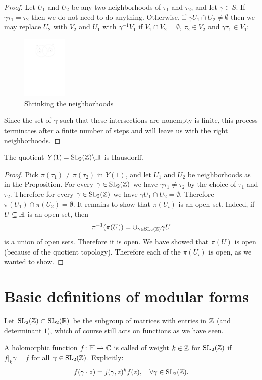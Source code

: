 \begin{proof}
  Let $U_1$ and $U_2$ be any two neighborhoods of $\tau_1$ and $\tau_2$, and let $\gamma\in S$. If $\gamma\tau_1=\tau_2$ then we do not need to do anything. Otherwise, if $\gamma U_1\cap U_2\neq \emptyset$ then we may replace $U_2$ with $V_2$ and $U_1$ with $\gamma^{-1} V_1$ if $V_1\cap V_2=\emptyset$, $\tau_2\in V_2$ and $\gamma\tau_1\in V_1$:
  \begin{figure}[h]
    \centering
    \includegraphics[height=3cm]{Pictures/shrinking-neighborhoods.pdf}
    \caption{Shrinking the neighborhoods}
    \label{fig:shriking-neighborhoods}
  \end{figure}
Since the set of $\gamma$ such that these intersections are nonempty is finite, this process terminates after a finite number of steps and will leave us with the right neighborhoods.
\end{proof}
\begin{corollary}
  The quotient $Y(1) = \operatorname{SL}_2(\mathbb{Z})\backslash\mathbb{H}$ is Hausdorff.
\end{corollary}
\begin{proof}
  Pick $\pi(\tau_1)\neq \pi(\tau_2)$ in $Y(1)$, and let $U_1$ and $U_2$ be neighborhoods as in the Proposition. For every $\gamma\in\operatorname{SL}_2(\mathbb{Z})$ we have $\gamma\tau_1\neq \tau_2$ by the choice of $\tau_1$ and $\tau_2$. Therefore for every $\gamma\in\operatorname{SL}_2(\mathbb{Z})$ we have $\gamma U_1\cap U_2=\emptyset$. Therefore $\pi(U_1)\cap\pi(U_2)=\emptyset$. It remains to show that $\pi(U_i)$ is an open set. Indeed, if $U\subseteq\mathbb{H}$ is an open set, then
\[
\pi^{-1}(\pi(U)) = \cup_{\gamma\in\operatorname{SL}_2(\mathbb{Z})} \gamma U
\]
is a union of open sets. Therefore it is open. We have showed that $\pi(U)$ is open (because of the quotient topology). Therefore each of the $\pi(U_i)$ is open, as we wanted to show.
\end{proof}

\section{Basic definitions of modular forms}
\label{sec:the-modular-group}

Let $\operatorname{SL}_2(\mathbb{Z})\subset\operatorname{SL}_2(\mathbb{R})$ be the subgroup of matrices with entries in $\mathbb{Z}$ (and determinant $1$), which of course still acts on functions as we have seen.
\begin{definition}
  A holomorphic function $f\colon \mathbb{H}\to\mathbb{C}$ is called  of weight $k\in\mathbb{Z}$ for $\operatorname{SL}_2(\mathbb{Z})$ if $f|_k\gamma = f$ for all $\gamma\in\operatorname{SL}_2(\mathbb{Z})$. Explicitly:
\begin{equation}
\label{eq:modular-transformation}
f(\gamma\cdot z) = j(\gamma,z)^k f(z),\quad\forall \gamma\in\operatorname{SL}_2(\mathbb{Z}).
\end{equation}

\end{definition}

